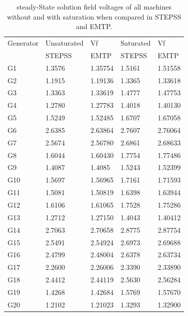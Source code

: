 \documentclass{report}
\begin{document}
\begin{table}[H]
\centering
\caption{steady-State solution field voltages of all machines without and with saturation when compared in STEPSS and EMTP.}
\begin{tabular}{l|l l| l l}  

Generator & Unsaturated & Vf & Saturated & Vf \\
 & STEPSS & EMTP & STEPSS & EMTP \\
\hline
G1 & 1.3576 &  1.35754 & 1.5161 & 1.51558\\
G2 & 1.1915  & 1.19136 & 1.3365 & 1.33618\\
G3 & 1.3363  &  1.33619 & 1.4777 & 1.47753\\
G4 & 1.2780  &  1.27783 & 1.4018  & 1.40130\\
G5 & 1.5249 & 1.52485 & 1.6707 &  1.67058\\
G6 & 2.6385 & 2.63864 & 2.7607 &  2.76064\\
G7 & 2.5674 & 2.56780 & 2.6861 & 2.68633 \\
G8 & 1.6044 & 1.60430 & 1.7754 & 1.77486\\
G9 & 1.4087 & 1.4085 & 1.5243 & 1.52399\\
G10 & 1.5697 & 1.56965 & 1.7161 & 1.71593\\
G11 & 1.5081 & 1.50819 &1.6398 & 1.63944\\
G12 & 1.6106 &  1.61065 &1.7528 & 1.75286\\
G13 & 1.2712 &  1.27150 &  1.4043 & 1.40412\\
G14 & 2.7063 &  2.70658& 2.8775 &  2.87754\\
G15 & 2.5491 &  2.54924 & 2.6973  & 2.69688\\
G16 & 2.4799 & 2.48004  & 2.6378  & 2.63734\\
G17 & 2.2600 &  2.26006 & 2.3390  & 2.33890\\
G18 & 2.4412 &  2.44119 & 2.5630  & 2.56284\\
G19 & 1.4268 &  1.42684 & 1.5769 & 1.57670\\
G20 & 1.2102 &  1.21023 & 1.3293 &  1.32900\\
\end{tabular}
\label{tab:Vf}
\end{table}
\end{document}
